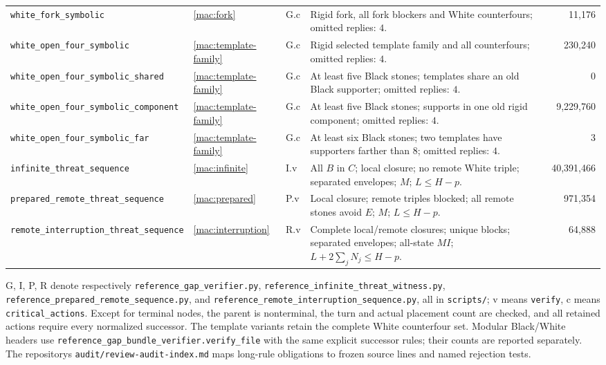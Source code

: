 \documentclass[11pt]{article}
\theoremstyle{definition}
\theoremstyle{remark}
\newcommand{\code}[1]{\texttt{#1}}
\begin{document}
\begin{longtable}{@{}>{\raggedright\arraybackslash}p{.25\linewidth}>{\raggedright\arraybackslash}p{.07\linewidth}>{\raggedright\arraybackslash}p{.09\linewidth}>{\raggedright\arraybackslash}p{.39\linewidth}r@{}}
\texttt{white\_\allowbreak fork\_\allowbreak symbolic} & \ref{mac:fork} & G.c & Rigid fork, all fork blockers and White counterfours; omitted replies: $4$. & 11,176\\
\texttt{white\_\allowbreak open\_\allowbreak four\_\allowbreak symbolic} & \ref{mac:template-family} & G.c & Rigid selected template family and all counterfours; omitted replies: $4$. & 230,240\\
\texttt{white\_\allowbreak open\_\allowbreak four\_\allowbreak symbolic\_\allowbreak shared} & \ref{mac:template-family} & G.c & At least five Black stones; templates share an old Black supporter; omitted replies: $4$. & 0\\
\texttt{white\_\allowbreak open\_\allowbreak four\_\allowbreak symbolic\_\allowbreak component} & \ref{mac:template-family} & G.c & At least five Black stones; supports in one old rigid component; omitted replies: $4$. & 9,229,760\\
\texttt{white\_\allowbreak open\_\allowbreak four\_\allowbreak symbolic\_\allowbreak far} & \ref{mac:template-family} & G.c & At least six Black stones; two templates have supporters farther than $8$; omitted replies: $4$. & 3\\
\texttt{infinite\_\allowbreak threat\_\allowbreak sequence} & \ref{mac:infinite} & I.v & All $B$ in $C$; local closure; no remote White triple; separated envelopes; $M$; $L\le H-p$. & 40,391,466\\
\texttt{prepared\_\allowbreak remote\_\allowbreak threat\_\allowbreak sequence} & \ref{mac:prepared} & P.v & Local closure; remote triples blocked; all remote stones avoid $E$; $M$; $L\le H-p$. & 971,354\\
\texttt{remote\_\allowbreak interruption\_\allowbreak threat\_\allowbreak sequence} & \ref{mac:interruption} & R.v & Complete local/remote closures; unique blocks; separated envelopes; all-state $MI$; $L+2\sum_jN_j\le H-p$. & 64,888\\
\bottomrule
\end{longtable}
\endgroup
\begingroup\par\smallskip\footnotesize\raggedright
G, I, P, R denote respectively \texttt{reference\_gap\_verifier.py},
\texttt{reference\_infinite\_threat\_witness.py},
\texttt{reference\_prepared\_remote\_sequence.py}, and
\texttt{reference\_remote\_interruption\_sequence.py}, all in \texttt{scripts/};
v means \texttt{verify}, c means \texttt{critical\_actions}.
Except for terminal nodes, the parent is nonterminal, the turn and actual
placement count are checked, and all retained actions require every normalized
successor. The template variants retain the complete White counterfour set.
Modular Black/White headers use \texttt{reference\_gap\_bundle\_verifier.}\allowbreak\texttt{verify\_file}
with the same explicit successor rules; their counts are reported separately.
The repository\textquotesingle s \code{audit/review-audit-index.md} maps
long-rule obligations to frozen source lines and named rejection tests.
\end{document}
